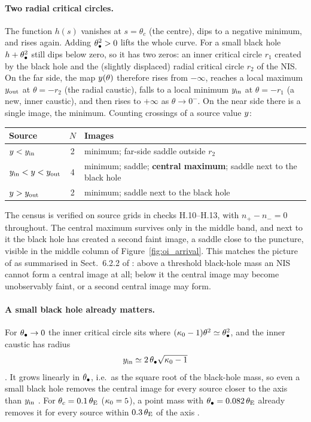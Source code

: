 \paragraph{Two radial critical circles.}
The function $h(s)$ vanishes at $s=\theta_c$ (the centre), dips to a
negative minimum, and rises again.  Adding $\theta_{\bullet}^2>0$ lifts the
whole curve.  For a small black hole $h+\theta_{\bullet}^2$ still dips below
zero, so it has two zeros: an inner critical circle $r_1$ created by
the black hole and the (slightly displaced) radial critical circle
$r_2$ of the NIS.  On the far side, the map $y(\theta)$ therefore
rises from $-\infty$, reaches a local maximum $y_{\rm out}$ at
$\theta=-r_2$ (the radial caustic), falls to a local minimum
$y_{\rm in}$ at $\theta=-r_1$ (a new, inner caustic), and then
rises to $+\infty$ as $\theta\to0^-$.  On the near side there is a
single image, the minimum.  Counting crossings of a source value
$y$:
\begin{center}
\small
\begin{tabular}{lcl}
\toprule
Source & $N$ & Images \\
\midrule
$y<y_{\rm in}$ & 2 & minimum; far-side saddle outside $r_2$ \\
$y_{\rm in}<y<y_{\rm out}$ & 4 & minimum; saddle; \textbf{central maximum}; saddle next to the black hole \\
$y>y_{\rm out}$ & 2 & minimum; saddle next to the black hole \\
\bottomrule
\end{tabular}
\end{center}
The census is verified on source grids in checks H.10--H.13, with
$n_+-n_-=0$ throughout.  The central maximum survives only in the
middle band, and next to it the black hole has created a second
faint image, a saddle close to the puncture, visible in the middle
column of Figure~\ref{fig:oi_arrival}.  This matches the picture of
\citet{mao_witt_koopmans_2001} as summarised in Sect.~6.2.2 of
\citet{congdon_principles_2018}: above a threshold black-hole mass an
NIS cannot form a central image at all; below it the central image may
become unobservably faint, or a second central image may form.

\paragraph{A small black hole already matters.}
For $\theta_{\bullet}\to0$ the inner critical circle sits where
$(\kappa_0-1)\theta^2\simeq\theta_{\bullet}^2$, and the inner caustic has
radius
\begin{equation}
    y_{\rm in} \simeq 2\,\theta_{\bullet}\sqrt{\kappa_0-1}
    \label{eq:oi_yin}
\end{equation}
.  It grows linearly in $\theta_{\bullet}$, i.e.\ as the square
root of the black-hole mass, so even a small black hole removes the
central image for every source closer to the axis than $y_{\rm in}$
.  For $\theta_c=0.1\,\theta_{\mathrm{E}}$ ($\kappa_0=5$), a point mass
with $\theta_{\bullet}=0.082\,\theta_{\mathrm{E}}$ already removes it for every source within
$0.3\,\theta_{\mathrm{E}}$ of the axis .

